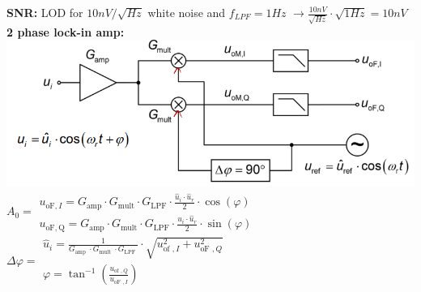 \documentclass[5pt,landscape]{article}
\begin{document}
\begin{multicols*}{5}
\textbf{SNR:}
LOD for $ 10nV/ \sqrt{Hz} $ white noise and $ f_{LPF} = 1Hz$ $ \rightarrow \frac{10nV}{\sqrt{Hz}} \cdot \sqrt{1Hz} = 10nV$\\
\textbf{2 phase lock-in amp:}\\
\includegraphics[width=\columnwidth]{images/two_phase_lockin.png}\\
$A_0 = \begin{array}{l}
u_{\mathrm{oF}, I}=G_{\mathrm{amp}} \cdot G_{\mathrm{mult}} \cdot G_{\mathrm{LPF}} \cdot \frac{\hat{u}_{i} \cdot \hat{u}_{r}}{2} \cdot \cos (\varphi) \\
u_{\mathrm{oF}, \mathrm{Q}}=G_{\mathrm{amp}} \cdot G_{\mathrm{mult}} \cdot G_{\mathrm{LPF}} \cdot \frac{\hat{u}_{i} \cdot \hat{u}_{r}}{2} \cdot \sin (\varphi)
\end{array} $\\
$ \Delta \varphi =\begin{array}{l}
\hat{u}_{i}=\frac{1}{G_{\text {amp }} \cdot G_{\text {mult }} \cdot G_{\text {LPF }}} \cdot \sqrt{u_{\text {of }, I}^{2}+u_{\text {oF }, Q}^{2}} \\
\varphi=\tan ^{-1}\left(\frac{u_{\text {of }, Q}}{u_{\text {oF }, I}}\right)
\end{array} $\\

\end{multicols*}
\end{document}

